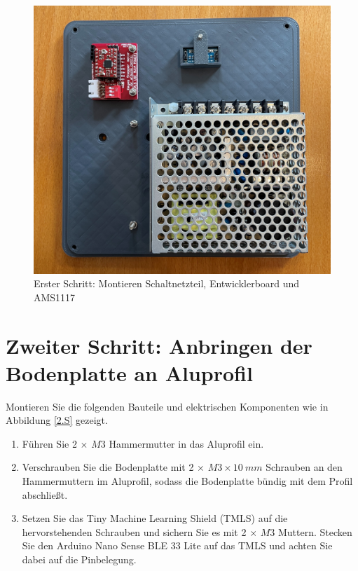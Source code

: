 \begin{figure}[H]
	\begin{center}
		\includegraphics[width=\textwidth]{Images/1Schr.jpg}
		\caption{Erster Schritt: Montieren Schaltnetzteil, Entwicklerboard und AMS1117} \label{1.S}
	\end{center}
\end{figure}


\section{Zweiter Schritt: Anbringen der Bodenplatte an Aluprofil}
Montieren Sie die folgenden Bauteile und elektrischen Komponenten wie in Abbildung \ref{2.S} gezeigt.

\begin{enumerate}
	\item Führen Sie 2 $\times$ $ M3 $ Hammermutter in das Aluprofil ein.
	\item Verschrauben Sie die Bodenplatte mit 2 $\times$ $ M3 \times 10 \ mm $ Schrauben an den Hammermuttern im Aluprofil, sodass die Bodenplatte bündig mit dem Profil abschließt.
	\item Setzen Sie das Tiny Machine Learning Shield (TMLS) auf die hervorstehenden Schrauben und sichern Sie es mit 2 $\times$ $ M3 $ Muttern.
	Stecken Sie den Arduino Nano Sense BLE 33 Lite auf das TMLS und achten Sie dabei auf die Pinbelegung.
\end{enumerate}

